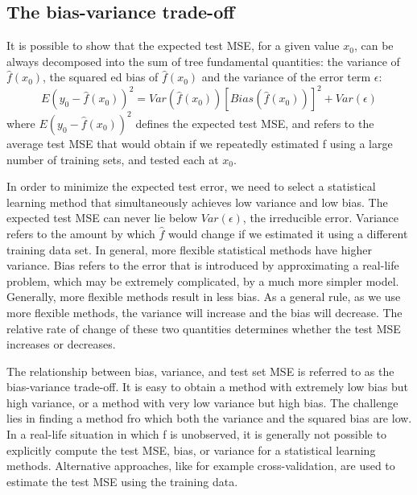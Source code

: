 \subsection{The bias-variance trade-off}

{\color{red}

    It is possible to show that the expected test MSE, for a given value $x_{0}$, can be always decomposed into the sum of tree fundamental quantities: the variance of $\hat{f}\left(x_{0}\right)$, the squared ed bias of $\hat{f}\left(x_{0}\right)$ and the variance of the error term $\epsilon$:
    \[
        E\left(y_{0}-\hat{f}\left(x_{0}\right)\right)^{2}=Var\left(\hat{f}\left(x_{0}\right)\right)\left[Bias\left(\hat{f}\left(x_{0}\right)\right)\right]^{2}+Var\left(\epsilon\right)
    \]
    where $E\left(y_{0}-\hat{f}\left(x_{0}\right)\right)^{2}$ defines the expected test MSE, and refers to the average test MSE that would obtain if we repeatedly estimated f using a large number of training sets, and tested each at $x_{0}$.

    In order to minimize the expected test error, we need to select a statistical learning method that simultaneously achieves low variance and low bias. The expected test MSE can never lie below $Var\left(\epsilon\right)$, the irreducible error. Variance refers to the amount by which $\hat{f}$ would change if we estimated it using a different training data set. In general, more flexible statistical methods have higher variance. Bias refers to the error that is introduced by approximating a real-life problem, which may be extremely complicated, by a much more simpler model. Generally, more flexible methods result in less bias. As a general rule, as we use more flexible methods, the variance will increase and the bias will decrease. The relative rate of change of these two quantities determines whether the test MSE increases or decreases.

    The relationship between bias, variance, and test set MSE is referred to as the bias-variance trade-off. It is easy to obtain a method with extremely low bias but high variance, or a method with very low variance but high bias. The challenge lies in finding a method fro which both the variance and the squared bias are low. In a real-life situation in which f is unobserved, it is generally not possible to explicitly compute the test MSE, bias, or variance for a statistical learning methods. Alternative approaches, like for example cross-validation, are used to estimate the test MSE using the training data.

}


